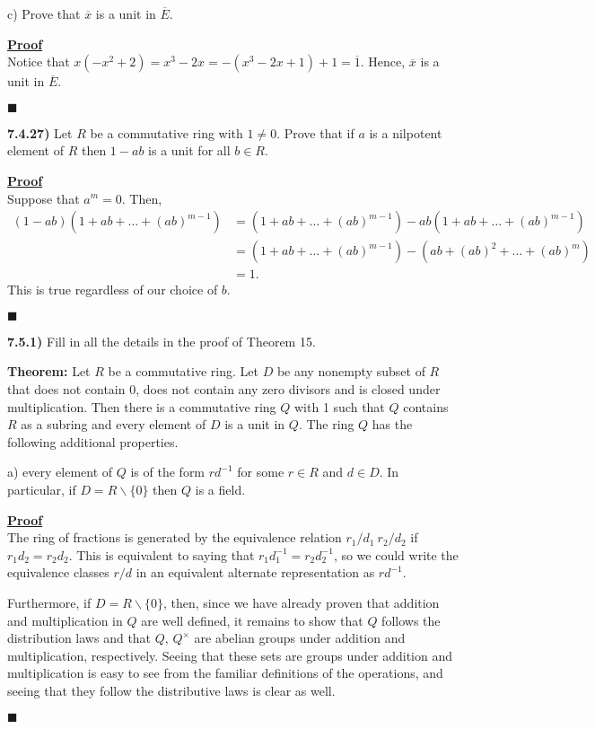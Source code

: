 \documentclass[12pt,a4paper]{article}
\newcommand{\prob}[2]{\textbf{#1)} #2}
\newenvironment{proof}
{
\textbf{\underline{Proof}} \\
}
{
\hfill $\blacksquare$
}
\begin{document}
c) Prove that $\overline{x}$ is a unit in $\overline{E}$.

\begin{proof}
    Notice that $x\left( -x^2 + 2 \right) = x^3 - 2x = -\left( x^3 - 2x + 1 \right) + 1 = \overline{1}$.
    Hence, $\overline{x}$ is a unit in $\overline{E}$.
\end{proof}

\prob{7.4.27}{
Let $R$ be a commutative ring with $1 \ne 0$.
Prove that if $a$ is a nilpotent element of $R$ then $1 - ab$ is a unit for all $b \in R$.
}

\begin{proof}
    Suppose that $a^{m} = 0$.
    Then, 
    \begin{align*}
        (1-ab)(1 + ab + \ldots + (ab)^{m-1}) &= (1 + ab + \ldots + (ab)^{m-1}) - ab(1 + ab + \ldots + (ab)^{m-1}) \\
        &= (1 + ab + \ldots + (ab)^{m-1}) - (ab + (ab)^2 + \ldots + (ab)^{m}) \\
        &= 1
    .\end{align*} 
    This is true regardless of our choice of $b$.
\end{proof}

\prob{7.5.1}{
    Fill in all the details in the proof of Theorem 15.
}

\textbf{Theorem:} Let $R$ be a commutative ring.
Let $D$ be any nonempty subset of $R$ that does not contain 0, does not contain any zero divisors and is closed under multiplication.
Then there is a commutative ring $Q$ with 1 such that $Q$ contains $R$ as a subring and every element of $D$ is a unit in $Q$.
The ring $Q$ has the following additional properties.

a) every element of $Q$ is of the form $rd^{-1}$ for some $r \in R$ and $d \in D$. 
In particular, if $D = R \backslash \{ 0 \} $ then $Q$ is a field.

\begin{proof}
   The ring of fractions is generated by the equivalence relation $r_1/d_1 ~ r_2/d_2$ if $r_1 d_2 = r_2 d_2$.
   This is equivalent to saying that $r_1 d_1^{-1} = r_2 d_2^{-1}$, so we could write the equivalence classes $r/d$ in an equivalent alternate representation as $r d^{-1}$.

   Furthermore, if $D = R \backslash \{ 0 \} $, then, since we have already proven that addition and multiplication in $Q$ are well defined, it remains to show that $Q$ follows the distribution laws and that $Q,\,Q^{\times}$ are abelian groups under addition and multiplication, respectively.
   Seeing that these sets are groups under addition and multiplication is easy to see from the familiar definitions of the operations, and seeing that they follow the distributive laws is clear as well.
\end{proof}
\end{document}
